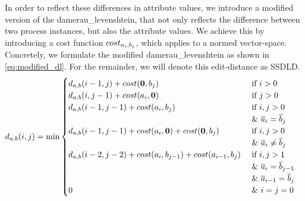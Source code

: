\documentclass[./../../paper.tex]{subfiles}
\begin{document}


\noindent In order to reflect these differences in attribute values, we introduce a modified version of the \gls{damerau_levenshtein}, that not only reflects the difference between two process instances, but also the attribute values. We achieve this by introducing a cost function $cost_{a_i, b_j}$, which applies to a normed vector-space\footnotemark. Concretely, we formulate the modified \gls{damerau_levenshtein} as shown in \autoref{eq:modified_dl}. For the remainder, we will denote this edit-distance as \gls{SSDLD}.
\begin{align}
    \label{eq:modified_dl}
    d_{a, b}(i, j) & =\min
    \begin{cases}
        d_{a, b}(i-1, j  )+cost(\mathbf{0}, b_j) & \text { if } i>0                                            \\
        d_{a, b}(i  , j-1)+cost(a_i, \mathbf{0}) & \text { if } j>0                                            \\
        d_{a, b}(i-1, j-1)+cost(a_i, b_j) & \text { if } i, j>0   \\ & \text { \& } \overline{a}_i=\overline{b}_j                                       \\
        d_{a, b}(i-1, j-1)+ cost(a_i, \mathbf{0}) +cost(\mathbf{0}, b_j)  & \text { if } i, j>0  \\ & \text { \& } \overline{a}_i \neq \overline{b}_j                                       \\
        d_{a, b}(i-2, j-2)+cost(a_i, b_{j-1}) + cost(a_{i-1}, b_j) & \text { if } i, j>1 \\ 
        & \text { \& } \overline{a}_i=\overline{b}_{j-1} \\ 
        & \text { \& } \overline{a}_{i-1}=\overline{b}_j \\
        0                                 & \text { \& } i=j=0                                          
    \end{cases} 
\end{align}
\end{document}
